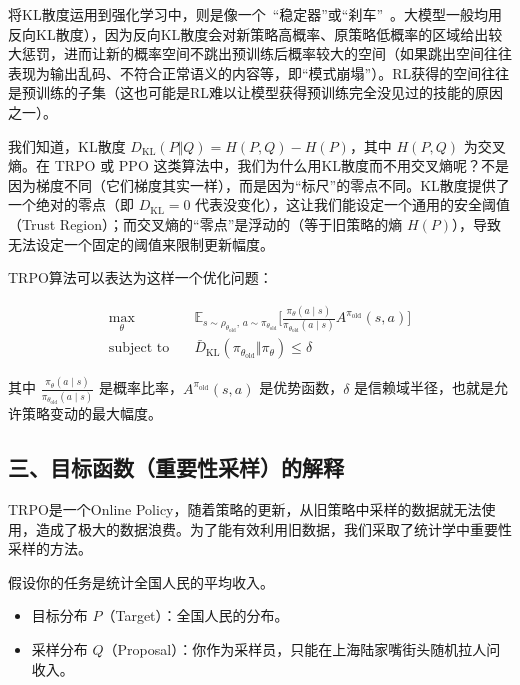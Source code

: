 将KL散度运用到强化学习中，则是像一个~``稳定器''或``刹车''~。大模型一般均用反向KL散度），因为反向KL散度会对新策略高概率、原策略低概率的区域给出较大惩罚，进而让新的概率空间不跳出预训练后概率较大的空间（如果跳出空间往往表现为输出乱码、不符合正常语义的内容等，即``模式崩塌''）。RL获得的空间往往是预训练的子集（这也可能是RL难以让模型获得预训练完全没见过的技能的原因之一）。

我们知道，KL散度 \(D_{\mathrm{KL}}(P\Vert Q)=H(P,Q)-H(P)\)，其中 \(H(P,Q)\) 为交叉熵。在 TRPO 或 PPO 这类算法中，我们为什么用KL散度而不用交叉熵呢？不是因为梯度不同（它们梯度其实一样），而是因为``标尺''的零点不同。KL散度提供了一个绝对的零点（即 \(D_{\mathrm{KL}}=0\) 代表没变化），这让我们能设定一个通用的安全阈值（Trust Region）；而交叉熵的``零点''是浮动的（等于旧策略的熵 \(H(P)\)），导致无法设定一个固定的阈值来限制更新幅度。

TRPO算法可以表达为这样一个优化问题：

\[
\begin{aligned}
\max_\theta\quad
& \mathbb{E}_{s\sim\rho_{\theta_{\mathrm{old}}},\,a\sim\pi_{\theta_{\mathrm{old}}}}
\bigl[
\frac{\pi_\theta(a\mid s)}{\pi_{\theta_{\mathrm{old}}}(a\mid s)}
A^{\pi_{\mathrm{old}}}(s,a)
\bigr] \\
\text{subject to}\quad
& \bar{D}_{\mathrm{KL}}(\pi_{\theta_{\mathrm{old}}}\Vert \pi_\theta)\le \delta
\end{aligned}
\]

其中 \(\frac{\pi_\theta(a\mid s)}{\pi_{\theta_{\mathrm{old}}}(a\mid s)}\) 是概率比率，\(A^{\pi_{\mathrm{old}}}(s,a)\) 是优势函数，\(\delta\) 是信赖域半径，也就是允许策略变动的最大幅度。

\hypertarget{ux4e09ux76eeux6807ux51fdux6570ux91cdux8981ux6027ux91c7ux6837ux7684ux89e3ux91ca}{%
\subsection{三、目标函数（重要性采样）的解释}\label{ux4e09ux76eeux6807ux51fdux6570ux91cdux8981ux6027ux91c7ux6837ux7684ux89e3ux91ca}}

TRPO是一个Online Policy，随着策略的更新，从旧策略中采样的数据就无法使用，造成了极大的数据浪费。为了能有效利用旧数据，我们采取了统计学中重要性采样的方法。

假设你的任务是统计全国人民的平均收入。

\begin{itemize}
\tightlist
\item
  目标分布 \(P\)（Target）：全国人民的分布。
\item
  采样分布 \(Q\)（Proposal）：你作为采样员，只能在上海陆家嘴街头随机拉人问收入。
\end{itemize}

